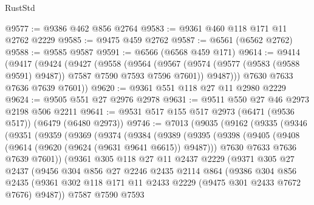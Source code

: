\begin{lexlean}{RustStd}
\begin{coremodule}
@9577 := @9386 @462 @856 @2764
@9583 := @9361 @460 @118 @171 @11 @2762 @2229
@9585 := @9475 @459 @2762
@9587 := @6561 (@6562 @2762)
@9588 := @9585 @9587
@9591 := @6566 (@6568 @459 @171)
@9614 := @9414
    (@9417
      (@9424
        (@9427
          (@9558
            (@9564
              (@9567 (@9574 (@9577 (@9583 (@9588 @9591) @9487)) @7587 @7590 @7593 @7596 @7601))
              @9487)))
        @7630
        @7633
        @7636
        @7639
        @7601))
@9620 := @9361 @551 @118 @27 @11 @2980 @2229
@9624 := @9505 @551 @27 @2976 @2978
@9631 := @9511 @550 @27 @46 @2973 @2198 @506 @2211
@9641 := @9531 @517 @155 @517 @2973 (@6471 (@9536 @517)) (@6479 (@6480 @2973))
@9746 := @7013
    (@9035
      (@9162
        (@9335
          (@9346
            (@9351
              (@9359
                (@9369
                  (@9374
                    (@9384
                      (@9389
                        (@9395
                          (@9398
                            (@9405
                              (@9408 (@9614 (@9620 (@9624 (@9631 @9641 @6615)) @9487)))
                              @7630
                              @7633
                              @7636
                              @7639
                              @7601))
                          (@9361
                            @305
                            @118
                            @27
                            @11
                            @2437
                            @2229
                            (@9371
                              @305
                              @27
                              @2437
                              (@9456
                                @304
                                @856
                                @27
                                @2246
                                @2435
                                @2114
                                @864
                                (@9386
                                  @304
                                  @856
                                  @2435
                                  (@9361
                                    @302
                                    @118
                                    @171
                                    @11
                                    @2433
                                    @2229
                                    (@9475 @301 @2433 @7672 @7676)
                                    @9487))
                                @7587
                                @7590
                                @7593

\end{coremodule}
\end{lexlean}
